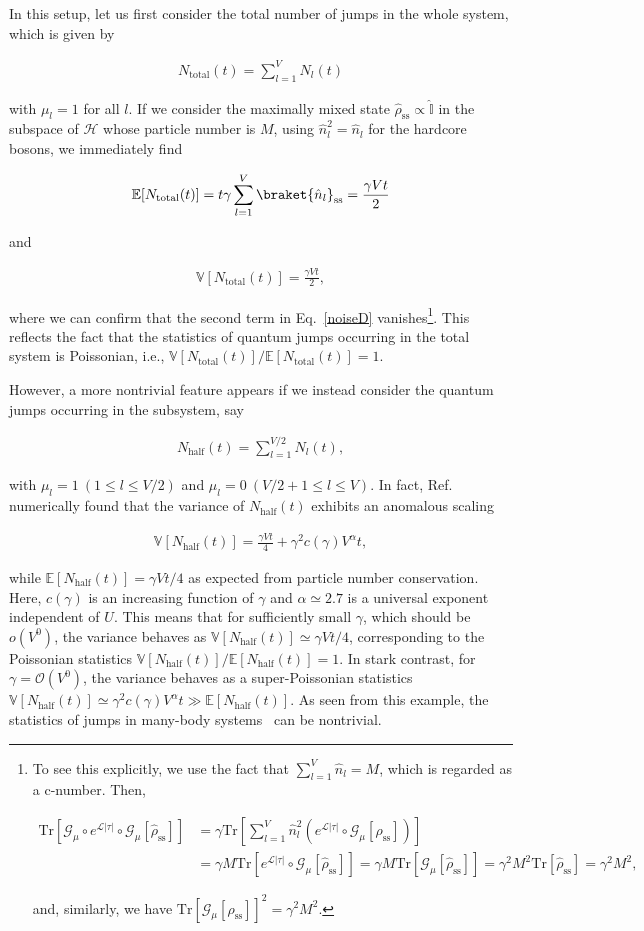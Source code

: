 \documentclass[preprint,pteplogo]{ptephy_v2}%
\numberwithin{equation}{section}
\theoremstyle{definition}
\newcommand{\mc}[1]{\mathcal{#1}}
\newcommand{\ml}[1]{\mathcal{#1}}
\newcommand{\mr}[1]{\mathrm{#1}}
\newcommand{\mbb}[1]{\mathbb{#1}}
\newcommand{\lrs}[1]{\left( #1 \right)}
\newcommand{\lrl}[1]{\left[ #1 \right]}
\newcommand{\aln}[1]{
\begin{align}
#1
\end{align}
}
\newcommand{\Tr}{\mr{Tr}}
\begin{document}
In this setup, let us first consider the total number of jumps in the whole system, which is given by
\aln{
N_\mr{total}(t)=\sum_{l=1}^V N_l(t)
}
with $\mu_l=1$ for all $l$.
If we consider the maximally mixed state $\hat{\rho}_\mr{ss}\propto \mbb{\hat{I}}$ in the subspace of $\mc{H}$ whose particle number is $M$, using $\hat{n}_l^2=\hat{n}_l$ for the hardcore bosons, we immediately find 
\aln{
\mbb{E}[N_\mr{total}(t)]=t\gamma\sum_{l=1}^V\braket{\hat{n}_l}_\mr{ss}=\frac{\gamma Vt}{2}
}
and
\aln{
\mbb{V}[N_\mr{total}(t)]=\frac{\gamma Vt}{2},
}
where we can confirm that the second term in Eq.~\eqref{noiseD} vanishes\footnote{
To see this explicitly, we use the fact that $\sum_{l=1}^V\hat{n}_l=M$, which is regarded as a c-number. 
Then, 
\aln{
\Tr[\ml{G}_\mu\circ e^{\ml{L}|\tau|}\circ\ml{G}_\mu[\hat{\rho}_\mr{ss}]]&=\gamma
\Tr\lrl{\sum_{l=1}^V\hat{n}_l^2\lrs{ e^{\ml{L}|\tau|}\circ\ml{G}_\mu[\hat{\rho}_\mr{ss}]}}\nonumber\\
&=
\gamma M\Tr\lrl{{ e^{\ml{L}|\tau|}\circ\ml{G}_\mu[\hat{\rho}_\mr{ss}]}}=\gamma M\Tr\lrl{{\ml{G}_\mu[\hat{\rho}_\mr{ss}]}}=\gamma^2M^2\Tr\lrl{{\hat{\rho}_\mr{ss}}}=\gamma^2M^2,
}
and, similarly, we have $\Tr[\ml{G}_\mu[\hat{\rho}_\mr{ss}]]^2=\gamma^2M^2$.
}.
This reflects the fact that the statistics of quantum jumps occurring in the total system is Poissonian, i.e., $\mbb{V}[N_\mr{total}(t)]/\mbb{E}[N_\mr{total}(t)]=1$.

However, a more nontrivial feature appears if we instead consider the quantum jumps occurring in the subsystem, say
\aln{
N_\mr{half}(t)=\sum_{l=1}^{V/2} N_l(t),
}
with $\mu_l=1\:(1\leq l\leq V/2)$ and $\mu_l=0\:(V/2+1\leq l\leq V)$.
In fact, Ref.~\cite{Yamamoto25} numerically found that the variance of $N_\mr{half}(t)$ exhibits an anomalous scaling
\aln{
\mbb{V}[N_\mr{half}(t)]=\frac{\gamma Vt}{4}+\gamma^2 c(\gamma)V^\alpha t,
}
while $\mbb{E}[N_\mr{half}(t)]=\gamma Vt/4$ as expected from particle number conservation.
Here, $c(\gamma)$ is an increasing function of $\gamma$ and $\alpha\simeq 2.7$ is a universal exponent independent of $U$.
This means that for sufficiently small $\gamma$, which should be $o(V^0)$, the variance behaves as $\mbb{V}[N_\mr{half}(t)]\simeq \gamma Vt/4$, corresponding to the Poissonian statistics $\mbb{V}[N_\mr{half}(t)]/\mbb{E}[N_\mr{half}(t)]=1$.
In stark contrast, for $\gamma=\ml{O}(V^0)$, the variance behaves as a super-Poissonian statistics $\mbb{V}[N_\mr{half}(t)]\simeq \gamma^2 c(\gamma)V^\alpha t \gg \mbb{E}[N_\mr{half}(t)]$.
As seen from this example, the statistics of jumps in many-body systems~\cite{ates2012dynamical, buvca2014exactly, vznidarivc2014anomalous, vznidarivc2014large, kewming2022diverging, matsumoto2025dissipative, cech2024space} can be nontrivial.
\end{document}
